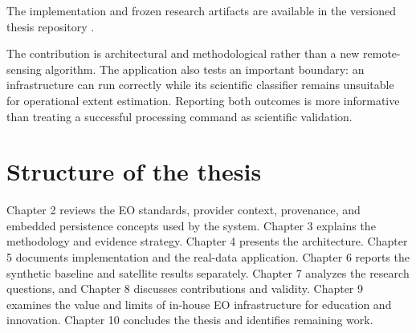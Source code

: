 The implementation and frozen research artifacts are available in the versioned thesis
repository \citep{kvarken-repo}.

The contribution is architectural and methodological rather than a new remote-sensing algorithm. The application also tests an important boundary: an infrastructure can run correctly while its scientific classifier remains unsuitable for operational extent estimation. Reporting both outcomes is more informative than treating a successful processing command as scientific validation.

\section{Structure of the thesis}

Chapter 2 reviews the EO standards, provider context, provenance, and embedded persistence
concepts used by the system. Chapter 3 explains the methodology and evidence strategy. Chapter
4 presents the architecture. Chapter 5 documents implementation and the real-data application.
Chapter 6 reports the synthetic baseline and satellite results separately. Chapter 7 analyzes
the research questions, and Chapter 8 discusses contributions and validity. Chapter 9 examines
the value and limits of in-house EO infrastructure for education and innovation. Chapter 10
concludes the thesis and identifies remaining work.
